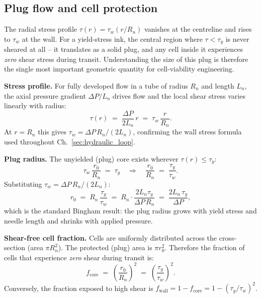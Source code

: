 \documentclass[11pt,a4paper]{article}
\begin{document}
\subsection{Plug flow and cell protection}

The radial stress profile $\tau(r)=\tau_w(r/R_n)$ vanishes at the
centreline and rises to $\tau_w$ at the wall.  For a yield-stress ink,
the central region where $\tau<\tau_y$ is never sheared at all -- it
translates as a solid plug, and any cell inside it experiences
\textit{zero} shear stress during transit.  Understanding the size of
this plug is therefore the single most important geometric quantity for
cell-viability engineering.

\begin{derivationbox}[title={DERIVATION --- Plug radius and shear-free cell fraction}]
\textbf{Stress profile.}
For fully developed flow in a tube of radius $R_n$ and length $L_n$,
the axial pressure gradient $\Delta P/L_n$ drives flow and the local
shear stress varies linearly with radius:
\begin{equation}
\tau(r) \;=\; \frac{\Delta P}{2L_n}\,r \;=\; \tau_w\,\frac{r}{R_n}.
\label{eq:tau_profile}
\end{equation}
At $r=R_n$ this gives $\tau_w=\Delta P\,R_n/(2L_n)$, confirming the
wall stress formula used throughout Ch.~\ref{sec:hydraulic_loop}.

\medskip
\textbf{Plug radius.}
The unyielded (plug) core exists wherever $\tau(r)\leq\tau_y$:
\begin{equation}
\tau_w\,\frac{r_0}{R_n} \;=\; \tau_y
\quad\Longrightarrow\quad
\frac{r_0}{R_n} \;=\; \frac{\tau_y}{\tau_w}.
\label{eq:r0_over_R}
\end{equation}
Substituting $\tau_w = \Delta P\,R_n/(2L_n)$:
\[
r_0 \;=\; R_n\,\frac{\tau_y}{\tau_w}
     \;=\; R_n\cdot\frac{2L_n\tau_y}{\Delta P\,R_n}
     \;=\; \frac{2L_n\,\tau_y}{\Delta P},
\]
which is the standard Bingham result: the plug radius grows with yield
stress and needle length and shrinks with applied pressure.

\medskip
\textbf{Shear-free cell fraction.}
Cells are uniformly distributed across the cross-section (area
$\pi R_n^2$).  The protected (plug) area is $\pi r_0^2$.  Therefore the
fraction of cells that experience \emph{zero} shear during transit is:
\begin{equation}
f_\mathrm{core}
  \;=\; \left(\frac{r_0}{R_n}\right)^{\!2}
  \;=\; \left(\frac{\tau_y}{\tau_w}\right)^{\!2}.
\label{eq:f_core}
\end{equation}
Conversely, the fraction exposed to high shear is
$f_\mathrm{wall}=1-f_\mathrm{core}=1-(\tau_y/\tau_w)^2$.


\end{derivationbox}
\end{document}
